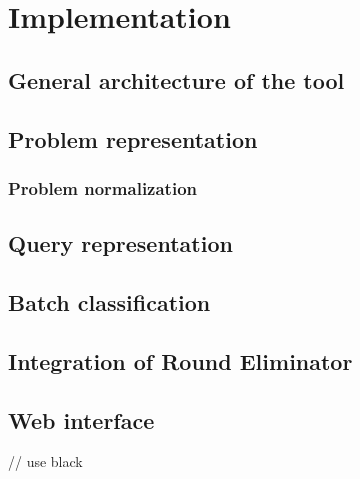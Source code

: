 \chapter{Implementation}
\label{chapter:implementation}

\section{General architecture of the tool}

\section{Problem representation}

\subsection{Problem normalization}

\section{Query representation}

\section{Batch classification}

\section{Integration of Round Eliminator}

\section{Web interface}


// use black
